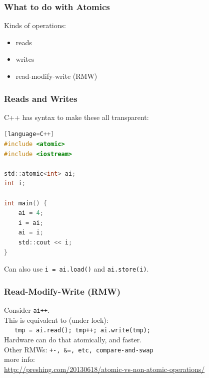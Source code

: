\begin{frame}
  \frametitle{What to do with Atomics}

  

    \Large
    Kinds of operations:
    \begin{itemize}
    \item reads
    \item writes
    \item read-modify-write (RMW)
    \end{itemize}
    
\end{frame}

\begin{frame}[fragile]
  \frametitle{Reads and Writes}

  
    C++ has syntax to make these all transparent:
\begin{lstlisting}[language=C][language=C++]
#include <atomic>
#include <iostream>

std::atomic<int> ai;
int i;

int main() {
    ai = 4;
    i = ai;
    ai = i;
    std::cout << i;
}
\end{lstlisting}
Can also use {\tt i = ai.load()} and {\tt ai.store(i)}.
  
\end{frame}

\begin{frame}
  \frametitle{Read-Modify-Write (RMW)}

  
    Consider {\tt ai++}.\\[1em]
    This is equivalent to (under lock): \\
    ~~~{\tt tmp = ai.read(); tmp++; ai.write(tmp); }\\[1em]
    Hardware can do that atomically, and faster.\\[1em]
    Other RMWs: {\tt +-, \&=, etc, compare-and-swap}\\[2em]

    {\small
      more info:\\ \url{http://preshing.com/20130618/atomic-vs-non-atomic-operations/}
      }
  
\end{frame}


